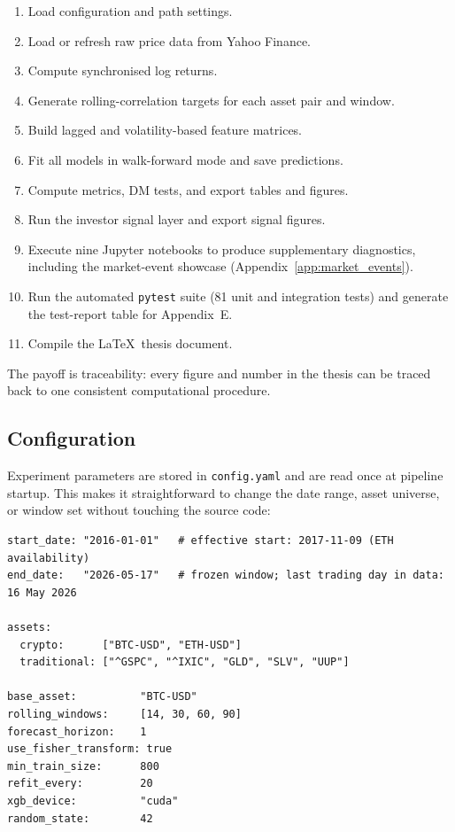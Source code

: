 \begin{enumerate}
    \item Load configuration and path settings.
    \item Load or refresh raw price data from Yahoo Finance.
    \item Compute synchronised log returns.
    \item Generate rolling-correlation targets for each asset pair and window.
    \item Build lagged and volatility-based feature matrices.
    \item Fit all models in walk-forward mode and save predictions.
    \item Compute metrics, DM tests, and export tables and figures.
    \item Run the investor signal layer and export signal figures.
    \item Execute nine Jupyter notebooks to produce supplementary diagnostics,
          including the market-event showcase (Appendix~\ref{app:market_events}).
    \item Run the automated \texttt{pytest} suite (81 unit and integration tests)
          and generate the test-report table for Appendix~E.
    \item Compile the \LaTeX\ thesis document.
\end{enumerate}

The payoff is traceability: every figure and number in the thesis can be traced back to one consistent computational procedure.

\subsection{Configuration}

Experiment parameters are stored in \texttt{config.yaml} and are read once at pipeline startup. This makes it straightforward to change the date range, asset universe, or window set without touching the source code:

\begin{lstlisting}[language={}, caption={Excerpt from \texttt{config.yaml} showing key experiment parameters.}, label=lst:config]
start_date: "2016-01-01"   # effective start: 2017-11-09 (ETH availability)
end_date:   "2026-05-17"   # frozen window; last trading day in data: 16 May 2026

assets:
  crypto:      ["BTC-USD", "ETH-USD"]
  traditional: ["^GSPC", "^IXIC", "GLD", "SLV", "UUP"]

base_asset:          "BTC-USD"
rolling_windows:     [14, 30, 60, 90]
forecast_horizon:    1
use_fisher_transform: true
min_train_size:      800
refit_every:         20
xgb_device:          "cuda"
random_state:        42
\end{lstlisting}

